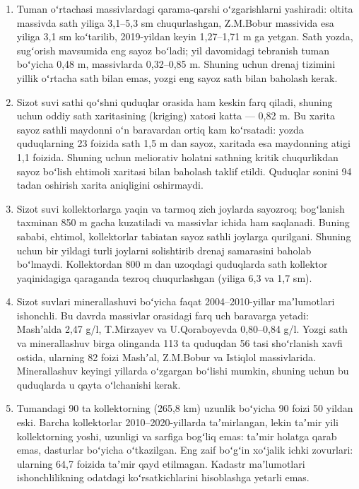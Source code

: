 \begin{enumerate}
\item
  Tuman oʻrtachasi massivlardagi qarama-qarshi oʻzgarishlarni yashiradi:
  oltita massivda sath yiliga 3,1--5,3 sm chuqurlashgan, Z.M.Bobur
  massivida esa yiliga 3,1 sm koʻtarilib, 2019-yildan keyin 1,27--1,71 m
  ga yetgan. Sath yozda, sugʻorish mavsumida eng sayoz boʻladi; yil
  davomidagi tebranish tuman boʻyicha 0,48 m, massivlarda 0,32--0,85 m.
  Shuning uchun drenaj tizimini yillik oʻrtacha sath bilan emas, yozgi
  eng sayoz sath bilan baholash kerak.
\item
  Sizot suvi sathi qoʻshni quduqlar orasida ham keskin farq qiladi,
  shuning uchun oddiy sath xaritasining (kriging) xatosi katta --- 0,82
  m. Bu xarita sayoz sathli maydonni oʻn baravardan ortiq kam
  koʻrsatadi: yozda quduqlarning 23 foizida sath 1,5 m dan sayoz,
  xaritada esa maydonning atigi 1,1 foizida. Shuning uchun meliorativ
  holatni sathning kritik chuqurlikdan sayoz boʻlish ehtimoli xaritasi
  bilan baholash taklif etildi. Quduqlar sonini 94 tadan oshirish xarita
  aniqligini oshirmaydi.
\item
  Sizot suvi kollektorlarga yaqin va tarmoq zich joylarda sayozroq;
  bogʻlanish taxminan 850 m gacha kuzatiladi va massivlar ichida ham
  saqlanadi. Buning sababi, ehtimol, kollektorlar tabiatan sayoz sathli
  joylarga qurilgani. Shuning uchun bir yildagi turli joylarni
  solishtirib drenaj samarasini baholab boʻlmaydi. Kollektordan 800 m
  dan uzoqdagi quduqlarda sath kollektor yaqinidagiga qaraganda tezroq
  chuqurlashgan (yiliga 6,3 va 1,7 sm).
\item
  Sizot suvlari minerallashuvi boʻyicha faqat 2004--2010-yillar
  maʼlumotlari ishonchli. Bu davrda massivlar orasidagi farq uch
  baravarga yetadi: Mashʼalda 2,47 g/l, T.Mirzayev va U.Qoraboyevda
  0,80--0,84 g/l. Yozgi sath va minerallashuv birga olinganda 113 ta
  quduqdan 56 tasi shoʻrlanish xavfi ostida, ularning 82 foizi Mashʼal,
  Z.M.Bobur va Istiqlol massivlarida. Minerallashuv keyingi yillarda
  oʻzgargan boʻlishi mumkin, shuning uchun bu quduqlarda u qayta
  oʻlchanishi kerak.
\item
  Tumandagi 90 ta kollektorning (265,8 km) uzunlik boʻyicha 90 foizi 50
  yildan eski. Barcha kollektorlar 2010--2020-yillarda taʼmirlangan,
  lekin taʼmir yili kollektorning yoshi, uzunligi va sarfiga bogʻliq
  emas: taʼmir holatga qarab emas, dasturlar boʻyicha oʻtkazilgan. Eng
  zaif boʻgʻin xoʻjalik ichki zovurlari: ularning 64,7 foizida taʼmir
  qayd etilmagan. Kadastr maʼlumotlari ishonchlilikning odatdagi
  koʻrsatkichlarini hisoblashga yetarli emas.

\end{enumerate}
